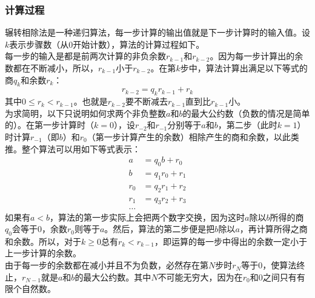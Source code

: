 \documentclass[UTF8]{ctexart}
\begin{document}
\subsubsection*{计算过程}
辗转相除法是一种递归算法，每一步计算的输出值就是下一步计算时的输入值。设$k$表示步骤数（从$0$开始计数），算法的计算过程如下。\\
每一步的输入是都是前两次计算的非负余数$r_{k−1}$和$r_{k−2}$。因为每一步计算出的余数都在不断减小，所以，$r_{k−1}$小于$r_{k−2}$。在第$k$步中，算法计算出满足以下等式的商$q_k$和余数$r_k$：
\[ r_{k-2} = q_kr_{k-1} + r_k \]
其中$0 \leq r_k < r_{k-1}$。也就是$r_{k−2}$要不断减去$r_{k−1}$直到比$r_{k−1}$小。\\
为求简明，以下只说明如何求两个非负整数$a$和$b$的最大公约数（负数的情况是简单的）。在第一步计算时（$k = 0$），设$r_{−2}$和$r_{−1}$分别等于$a$和$b$，第二步（此时$k = 1$）时计算$r_{−1}$（即$b$）和$r_0$（第一步计算产生的余数）相除产生的商和余数，以此类推。整个算法可以用如下等式表示：
\[
    \begin{aligned}
        a   & = q_0b + r_0   \\
        b   & = q_1r_0 + r_1 \\
        r_0 & = q_2r_1 + r_2 \\
        r_1 & = q_3r_2 + r_3 \\
        \ldots
    \end{aligned}
\]
如果有$a < b$，算法的第一步实际上会把两个数字交换，因为这时$a$除以$b$所得的商$q_0$会等于$0$，余数$r_0$则等于$a$。然后，算法的第二步便是把$b$除以$a$，再计算所得之商和余数。所以，对于$k \geq 0$总有$r_k < r_{k−1}$，即运算的每一步中得出的余数一定小于上一步计算的余数。\\
由于每一步的余数都在减小并且不为负数，必然存在第$N$步时$r_N$等于$0$，使算法终止，$r_{N−1}$就是$a$和$b$的最大公约数。其中$N$不可能无穷大，因为在$r_0$和$0$之间只有有限个自然数。
\end{document}
